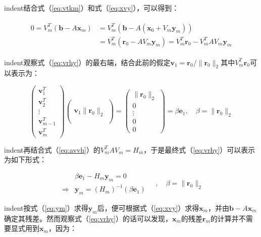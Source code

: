 \documentclass[UTF8,nofonts]{ctexart}
\begin{document}
indent结合式（\ref{eq:vtkm}）和式（\ref{eq:xvy}），可以得到：

\begin{align}
\label{eq:vrhy}
\begin{split}
0=V_m^T(\boldsymbol{b}-A\boldsymbol{x}_m)&=V_m^T(\boldsymbol{b}-A(\boldsymbol{x}_0+V_m\boldsymbol{y}_m)) \\
&=V_m^T(\boldsymbol{r}_0-AV_m\boldsymbol{y}_m)=V_m^T\boldsymbol{r}_0-V_m^TAV_m\boldsymbol{y}_m
\end{split}
\end{align}

indent观察式（\ref{eq:vrhy}）的最右端，结合此前的假定$\boldsymbol{v}_1=\boldsymbol{r}_0/\|\boldsymbol{r}_0\|_2$其中$V_m^T\boldsymbol{r}_0$可以表示为：

\[
\begin{pmatrix}\boldsymbol{v}_1^T\\\boldsymbol{v}_2^T\\\vdots\\\boldsymbol{v}^T_{m-1}\\\boldsymbol{v}_m^T\end{pmatrix}
\begin{pmatrix}~\\~\\\boldsymbol{v}_1\|\boldsymbol{r}_0\|_2\\~\\~\end{pmatrix}=
\begin{pmatrix}\|\boldsymbol{r}_0\|_2\\0\\\vdots\\0\\0\end{pmatrix}=\beta\boldsymbol{e}_1,\quad\beta=\|\boldsymbol{r}_0\|_2
\]

indent再结合式（\ref{eq:avvh}）的$V_m^TAV_m=H_m$，于是最终式（\ref{eq:vrhy}）可以表示为如下形式：

\begin{equation}
\label{eq:ym}
\begin{array}{lc}
& \beta\boldsymbol{e}_1-H_m\boldsymbol{y}_m=0 \\
\Longrightarrow & \boldsymbol{y}_m=(H_m)^{-1}(\beta\boldsymbol{e}_1)
\end{array}\quad
,\quad\beta=\|\boldsymbol{r}_0\|_2
\end{equation}

indent按式（\ref{eq:ym}）求得$\boldsymbol{y}_m$后，便可根据式（\ref{eq:xvy}）求得$\boldsymbol{x}_m$，并由$\boldsymbol{b}-A\boldsymbol{x}_m$确定其残差。然而观察式（\ref{eq:vrhy}）的话可以发现，$\boldsymbol{x}_m$的残差$\boldsymbol{r}_m$的计算并不需要显式用到$\boldsymbol{x}_m$，因为：
\end{document}
